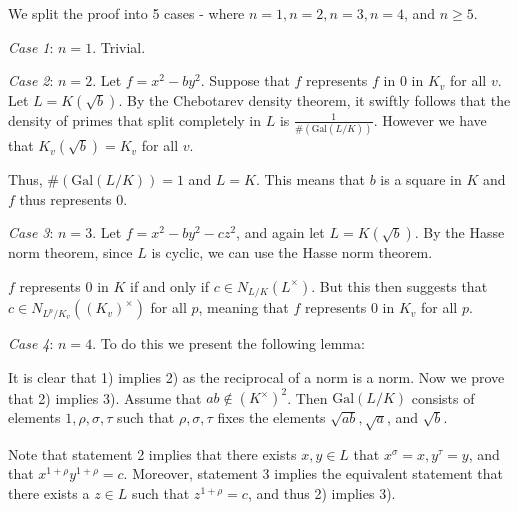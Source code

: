 \documentclass[a4paper, 12pt,oneside,openany]{book}
\begin{document}
 We split the proof into 5 cases - where $n=1, n=2, n=3, n=4$, and $n \geq 5$.

\emph{Case 1}: $n=1$. Trivial.

\emph{Case 2}: $n=2$. Let $f = x^2-by^2.$ Suppose that $f$ represents $f$ in $0$ in $K_v$ for all $v$. Let $L = K(\sqrt{b})$. By the Chebotarev density theorem, it swiftly follows that the density of primes that split completely in $L$ is $\frac{1}{\#(\text{Gal}(L/K))}$. However we have that $K_v(\sqrt{b})=K_v$ for all $v$. 

Thus, $\#(\text{Gal}(L/K))=1$ and $L=K$. This means that $b$ is a square in $K$ and $f$ thus represents 0.

\emph{Case 3}: $n=3$. Let $f = x^2-by^2-cz^2$, and again let $L=K(\sqrt{b})$. By the Hasse norm theorem, since $L$ is cyclic, we can use the Hasse norm theorem. 

$f$ represents 0 in $K$ if and only if $c \in N_{L/K}(L^\times)$. But this then suggests that $c \in N_{L^p/K_v}((K_v)^\times)$ for all $p$, meaning that $f$ represents 0 in $K_v$ for all $p$.

\emph{Case 4}: $n=4$. To do this we present the following lemma:


 It is clear that 1) implies 2) as the reciprocal of a norm is a norm. Now we prove that 2) implies 3). Assume that $ab \not\in (K^\times)^2$. Then $\text{Gal}(L/K)$ consists of elements $1, \rho, \sigma, \tau$ such that $\rho, \sigma, \tau$ fixes the elements $\sqrt{ab}, \sqrt{a}$, and $\sqrt{b}$. 

Note that statement 2 implies that there exists $x, y \in L$ that $x^\sigma = x, y^\tau=y$, and that $x^{1+\rho}y^{1+\rho}=c$. Moreover, statement 3 implies the equivalent statement that there exists a $z \in L$ such that $z^{1+\rho}=c$, and thus 2) implies 3). 
\end{document}
